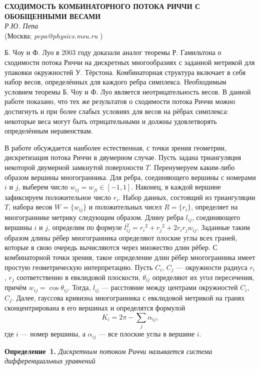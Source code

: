 \begin{center}{ \bf СХОДИМОСТЬ КОМБИНАТОРНОГО ПОТОКА РИЧЧИ С ОБОБЩЕННЫМИ ВЕСАМИ}\\
{\it Р.Ю. Пепа } \\
(Москва; {\it pepa@physics.msu.ru} )
\end{center}


Б. Чоу и Ф. Луо в 2003 году доказали аналог теоремы Р. Гамильтона о сходимости потока Риччи на дискретных многообразиях с заданной метрикой для  упаковки окружностей У. Тёрстона. Комбинаторная структура включает в себя набор весов, определённых для каждого ребра симплекса. Необходимым условием теоремы Б. Чоу и Ф. Луо является неотрицательность весов. В данной работе показано, что тех же результатов о сходимости потока Риччи можно достигнуть и при более слабых условиях для весов на рёбрах симплекса: некоторые веса могут быть отрицательными и должны удовлетворять определённым неравенствам.

В работе обсуждается наиболее
естественная, с точки
зрения геометрии, дискретизация потока
Риччи в двумерном случае.
Пусть задана триангуляция некоторой
двумерной замкнутой поверхности $T$.
Перенумеруем каким-либо образом вершины
многогранника. Для ребра,
соединяющего вершины с номерами $i$ и $j$,
выберем число $ w_{ij} =
w_{ji} \in [-1,1]$. Наконец, в каждой вершине
зафиксируем
положительное число $r_i$. Набор данных,
состоящий из триангуляции
$T$, набора весов $W = \{ w_{ij} \}$ и положительных чисел
$R = \{ r_i \}$, определяет на многограннике
метрику следующим
образом. Длину ребра $l_{ij}$, соединяющего
вершины $i$ и $j$,
определим по формуле $l_{ij}^2 = {r_i}^2 + {r_j}^2 +
2r_i
r_jw_{ij}$. Заданные таким образом длины
рёбер многогранника
определяют плоские углы всех граней, которые в свою очередь вычисляются через множество длин рёбер.
С комбинаторной точки зрения, такое определение длин рёбер многогранника имеет простую геометрическую интерпретацию. Пусть  $C_i$, $C_j$ --- окружности радиуса $r_i$, $r_j$ соответственно  в евклидовой плоскости, $ \theta_{ij} $ определяют их угол пересечения, причём $ w_{ij} = \cos \theta_{ij} $. Тогда, $l_{ij}$ --- расстояние между центрами окружностей $C_i$, $C_j$.
Далее, гауссова кривизна многогранника с
евклидовой метрикой на
гранях сконцентрирована в его вершинах и
определятся формулой
$$
K_i = 2 \pi - \sum_{j} \alpha_{ij},
$$
где $i$ --- номер вершины, а $\alpha_{ij}$ --- все
плоские углы в
вершине $i$.

\textbf{Определение~1.} {\it
Дискретным потоком Риччи называется
система дифференциальных уравнений}

